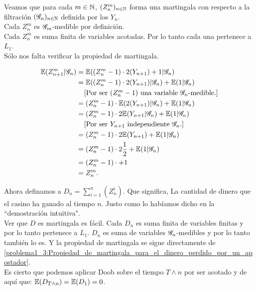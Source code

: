 	Veamos que para cada $m \in \mathbb{N}$, $(Z_n^m)_{n \in \mathbb{N}}$ forma una martingala con respecto a la filtración $(\mathscr{G}_n)_{n \in \mathbb{N}}$ 
	definida por los $Y_n$.\\
	
	Cada $Z_n^m$ es $\mathscr{G}_m$-medible por definición.\\
	
	Cada $Z_n^m$ es suma finita de variables acotadas. Por lo tanto cada una pertenece a $L_1$.\\
	
	Sólo nos falta verificar la propiedad de martingala.
	
	\begin{align}\label{problema1_3:Propiedad_de_martingala_para_el_dinero_perdido_por_un_apostador}
		\mathbb{E}(Z_{n+1}^{m} | \mathscr{G}_n) &= \mathbb{E}((Z_n^{m} - 1) \cdot 2(Y_{n+1}) + 1 | \mathscr{G}_n)\\
							   &= \mathbb{E}((Z_n^{m} -1) \cdot 2(Y_{n+1}) | \mathscr{G}_n) + \mathbb{E}( 1 | \mathscr{G}_n)\\
							   &\;\;\;\;\mbox{[Por ser $(Z_n^{m} - 1)$ una variable $\mathscr{G}_n$-medible.]}\\
							   &= (Z_n^{m} -1) \cdot \mathbb{E}(  2(Y_{n+1}) | \mathscr{G}_n) + \mathbb{E}( 1 | \mathscr{G}_n)\\
							   &= (Z_n^{m} -1) \cdot 2\mathbb{E}( Y_{n+1} | \mathscr{G}_n) + \mathbb{E}( 1 | \mathscr{G}_n)\\
							   &\;\;\;\;\mbox{[Por ser $Y_{n + 1}$ independiente $\mathscr{G}_n$.]}\\
							   &= (Z_n^{m} -1) \cdot 2\mathbb{E}( Y_{n+1}) + \mathbb{E}( 1 | \mathscr{G}_n)\\
							   &= (Z_n^{m} -1) \cdot 2 \frac{1}{2} + \mathbb{E}( 1 | \mathscr{G}_n)\\
							   &= (Z_n^{m} -1) \cdot + 1 \\
							   &= Z_n^m.
	\end{align}
	
	Ahora definamos a $D_n = \sum_{i=1}^n (Z_n^i)$. Que significa, La cantidad de dinero que el casino ha ganado al tiempo $n$. 
	Justo como lo habíamos dicho en la ``demostración intuitiva".\\
	
	Ver que $D$ es martingala es fácil. Cada $D_n$ es suma finita de variables finitas y por lo tanto pertenece a $L_1$.
	$D_n$ es suma de variables $\mathscr{G}_n$-medibles y por lo tanto también lo es. Y la propiedad de martingala se sigue directamente de
	\eqref{problema1_3:Propiedad_de_martingala_para_el_dinero_perdido_por_un_apostador}.\\
	
	Es cierto que podemos aplicar Doob sobre el tiempo $T \wedge n$ por ser acotado y de aquí que:
	$\mathbb{E}(D_{T \wedge n}) = \mathbb{E}(D_1) = 0$.\\
	
